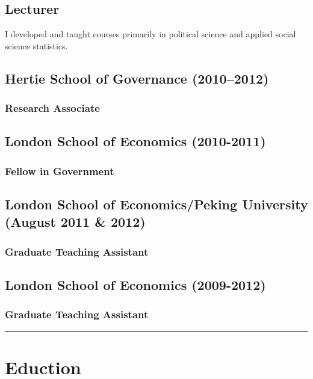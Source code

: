 \documentclass[a4paper]{article}
\begin{document}
{\subsection*{Lecturer}

I developed and taught courses primarily in political science and applied social science statistics.
\vspace{0.25cm}

\subsection*{Hertie School of Governance (2010--2012)}
\subsubsection*{Research Associate}

\subsection*{London School of Economics (2010-2011)}
\subsubsection*{Fellow in Government}

\subsection*{London School of Economics/Peking University (August 2011 \& 2012)}
\subsubsection*{Graduate Teaching Assistant}

\subsection*{London School of Economics (2009-2012)}
\subsubsection*{Graduate Teaching Assistant}

\vspace{0.25cm}
\medskip\hrule height 1pt
\vspace{0.5cm}


\section*{Eduction}

}
\end{document}
